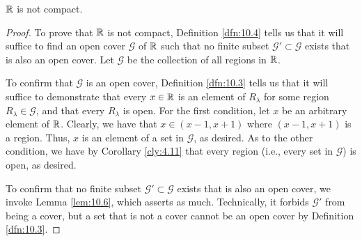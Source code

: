 \documentclass[../main.tex]{subfiles}
\begin{document}
\begin{theorem}\label{trm:10.7}
    $\mathbb{R}$ is not compact.
    \begin{proof}
        To prove that $\mathbb{R}$ is not compact, Definition \ref{dfn:10.4} tells us that it will suffice to find an open cover $\mathcal{G}$ of $\mathbb{R}$ such that no finite subset $\mathcal{G}'\subset\mathcal{G}$ exists that is also an open cover. Let $\mathcal{G}$ be the collection of all regions in $\mathbb{R}$.\par
        To confirm that $\mathcal{G}$ is an open cover, Definition \ref{dfn:10.3} tells us that it will suffice to demonstrate that every $x\in\mathbb{R}$ is an element of $R_\lambda$ for some region $R_\lambda\in\mathcal{G}$, and that every $R_\lambda$ is open. For the first condition, let $x$ be an arbitrary element of $\mathbb{R}$. Clearly, we have that $x\in(x-1,x+1)$ where $(x-1,x+1)$ is a region. Thus, $x$ is an element of a set in $\mathcal{G}$, as desired. As to the other condition, we have by Corollary \ref{cly:4.11} that every region (i.e., every set in $\mathcal{G}$) is open, as desired.\par
        To confirm that no finite subset $\mathcal{G}'\subset\mathcal{G}$ exists that is also an open cover, we invoke Lemma \ref{lem:10.6}, which asserts as much. Technically, it forbids $\mathcal{G}'$ from being a cover, but a set that is not a cover cannot be an open cover by Definition \ref{dfn:10.3}.
    \end{proof}
\end{theorem}
\end{document}
